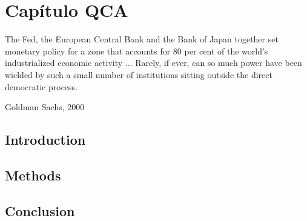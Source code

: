 \documentclass[12pt,openright,oneside,a4paper,english,sumario=tradicional]{gpsabntex}
\numberwithin{listing}{chapter}
\begin{document}
\tableofcontents*
\thispagestyle{empty}

\mainmatter
\cleardoublepage
\pagestyle{plain} %
\renewcommand{\thepage}{\arabic{page}}  %


\thispagestyle{empty} %

\chapter{Capítulo QCA}
\label{sec:orgc21e30e}

\epigraph{The Fed, the European Central Bank and the Bank of Japan together set monetary policy for a zone that accounts for 80 per cent of the world’s
industrialized economic activity ... Rarely, if ever, can so much power have been wielded by such a small number of institutions sitting outside the
direct democratic process.}{Goldman Sachs, 2000}


\section{Introduction}
\label{sec:orgea8441a}

\section{Methods}
\label{sec:org4e67941}

\section{Conclusion}
\label{sec:org20044f3}
\appendix
\end{document}
